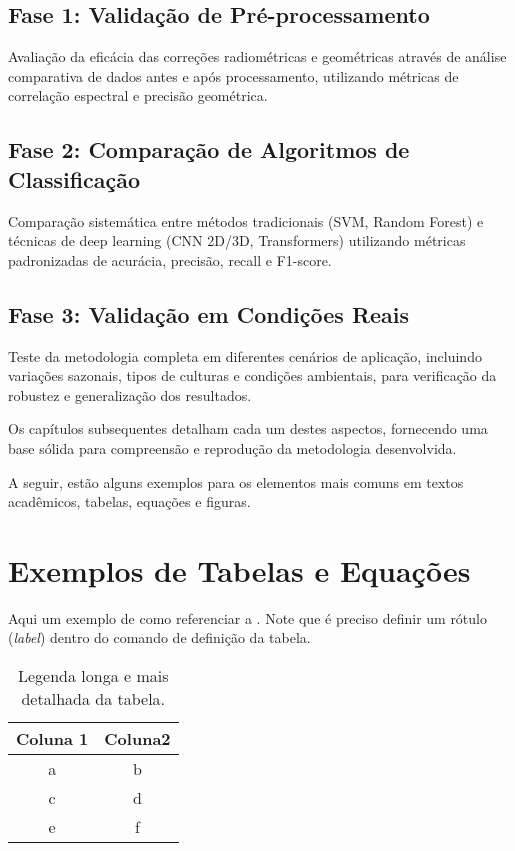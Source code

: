 \subsection{Fase 1: Validação de Pré-processamento}
Avaliação da eficácia das correções radiométricas e geométricas através de análise comparativa de dados antes e após processamento, utilizando métricas de correlação espectral e precisão geométrica.

\subsection{Fase 2: Comparação de Algoritmos de Classificação}
Comparação sistemática entre métodos tradicionais (SVM, Random Forest) e técnicas de deep learning (CNN 2D/3D, Transformers) utilizando métricas padronizadas de acurácia, precisão, recall e F1-score.

\subsection{Fase 3: Validação em Condições Reais}
Teste da metodologia completa em diferentes cenários de aplicação, incluindo variações sazonais, tipos de culturas e condições ambientais, para verificação da robustez e generalização dos resultados.

Os capítulos subsequentes detalham cada um destes aspectos, fornecendo uma base sólida para compreensão e reprodução da metodologia desenvolvida.

A seguir, estão alguns exemplos para os elementos mais comuns em textos acadêmicos, \ie tabelas, equações e figuras. 

\section{Exemplos de Tabelas e Equações}\label{sec:exemplostabelas}
Aqui um exemplo de como referenciar a . Note que é preciso definir um rótulo (\textit{label}) dentro do comando de definição da tabela.

\begin{table}[!htp]
\caption[Legenda curta da tabela]{Legenda longa e mais detalhada da tabela.}
\label{tab:tabela_1}
\begin{center}
\begin{tabular}{cc}
\toprule %
Coluna 1 & Coluna2 \\ \midrule %
a & b \\
c & d \\
e & f \\\bottomrule %
\end{tabular}
\end{center}
\end{table}

